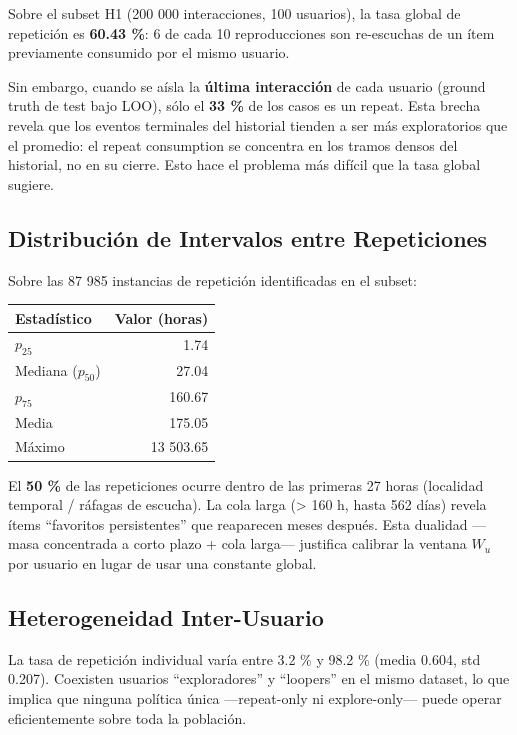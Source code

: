 \documentclass{article}
\begin{document}
Sobre el subset H1 (200 000 interacciones, 100 usuarios), la tasa global de repetición es \textbf{60.43 \%}: 6 de cada 10 reproducciones son re-escuchas de un ítem previamente consumido por el mismo usuario.

Sin embargo, cuando se aísla la \textbf{última interacción} de cada usuario (ground truth de test bajo LOO), sólo el \textbf{33 \%} de los casos es un repeat. Esta brecha revela que los eventos terminales del historial tienden a ser más exploratorios que el promedio: el repeat consumption se concentra en los tramos densos del historial, no en su cierre. Esto hace el problema más difícil que la tasa global sugiere.

\subsection{Distribución de Intervalos entre Repeticiones}\label{distribuciuxf3n-de-intervalos-entre-repeticiones}

Sobre las 87 985 instancias de repetición identificadas en el subset:

{\def\LTcaptype{none} %
\begin{longtable}[]{@{}lr@{}}
\toprule\noalign{}
Estadístico & Valor (horas) \\
\midrule\noalign{}
\endhead
\bottomrule\noalign{}
\endlastfoot
\(p_{25}\) & 1.74 \\
Mediana (\(p_{50}\)) & 27.04 \\
\(p_{75}\) & 160.67 \\
Media & 175.05 \\
Máximo & 13 503.65 \\
\end{longtable}
}

El \textbf{50 \%} de las repeticiones ocurre dentro de las primeras 27 horas (localidad temporal / ráfagas de escucha). La cola larga (\textgreater{} 160 h, hasta 562 días) revela ítems ``favoritos persistentes'' que reaparecen meses después. Esta dualidad ---masa concentrada a corto plazo + cola larga--- justifica calibrar la ventana \(W_u\) por usuario en lugar de usar una constante global.

\subsection{Heterogeneidad Inter-Usuario}\label{heterogeneidad-inter-usuario}

La tasa de repetición individual varía entre 3.2 \% y 98.2 \% (media 0.604, std 0.207). Coexisten usuarios ``exploradores'' y ``loopers'' en el mismo dataset, lo que implica que ninguna política única ---repeat-only ni explore-only--- puede operar eficientemente sobre toda la población.
\end{document}
